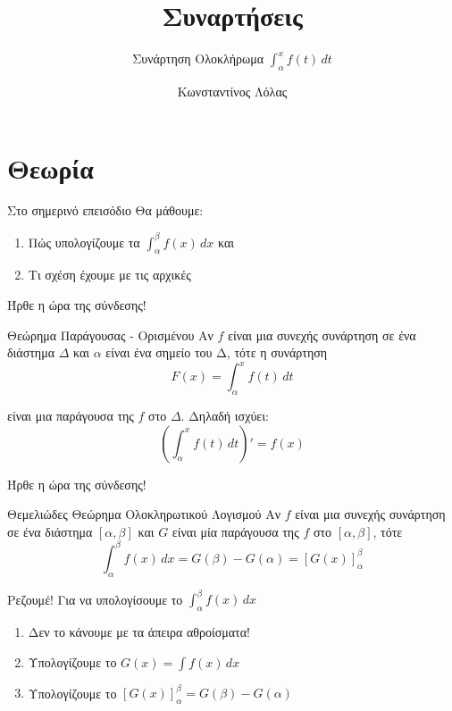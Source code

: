 \documentclass{presentation}
\title{Συναρτήσεις}
\subtitle{Συνάρτηση Ολοκλήρωμα $\int_α^x f(t)\, dt$}
\author[Λόλας]{Κωνσταντίνος Λόλας}
\institute[$10^ο$ ΓΕΛ]{$10^ο$ ΓΕΛ Θεσσαλονίκης}
\begin{document}
\begin{frame}
  \titlepage
\end{frame}

\section{Θεωρία}

\begin{frame}{Στο σημερινό επεισόδιο}
  Θα μάθουμε:
  \begin{enumerate}
    \item Πώς υπολογίζουμε τα $\int_α^β f(x)\, dx$ και
    \item Τι σχέση έχουμε με τις αρχικές
  \end{enumerate}
\end{frame}

\begin{frame}{Ήρθε η ώρα της σύνδεσης!}
  \begin{block}{Θεώρημα Παράγουσας - Ορισμένου}
    Αν $f$ είναι μια συνεχής συνάρτηση σε ένα διάστημα $Δ$ και $α$ είναι ένα σημείο του Δ, τότε η συνάρτηση
    $$F(x)=\int_α^x f(t) \, dt$$

    είναι μια παράγουσα της $f$ στο $Δ$. Δηλαδή ισχύει:
    $$\left( \int_α^x f(t) \, dt \right)'=f(x)$$
  \end{block}
\end{frame}

\begin{frame}{Ήρθε η ώρα της σύνδεσης!}
  \begin{block}{Θεμελιώδες Θεώρημα Ολοκληρωτικού Λογισμού}
    Αν $f$ είναι μια συνεχής συνάρτηση σε ένα διάστημα $[α,β]$ και $G$ είναι μία παράγουσα της $f$ στο $[α,β]$, τότε
    $$\int_α^β f(x) \, dx=G(β)-G(α)=\left[ G(x) \right]_α^β $$
  \end{block}
\end{frame}

\begin{frame}{Ρεζουμέ!}
  Για να υπολογίσουμε το $\int_α^β f(x)\, dx$
  \begin{enumerate}[<+->]
    \item Δεν το κάνουμε με τα άπειρα αθροίσματα!
    \item Υπολογίζουμε το $G(x)=\int f(x)\, dx$
    \item Υπολογίζουμε το $\left[ G(x) \right]_α^β=G(β)-G(α) $
  \end{enumerate}
\end{frame}
\end{document}
